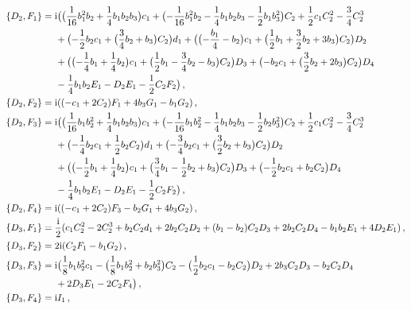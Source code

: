 \documentclass[10pt]{amsart}
\theoremstyle{definition}
\theoremstyle{corollary}
\theoremstyle{remark}
\theoremstyle{conclusion}
\begin{document}
\begin{align}
\{D_2, F_1\}&={\rm i}\bigl(\bigl(\frac{1}{16}b_1^2 b_2+\frac{1}{4}b_1 b_2 b_3\bigl)c_1+\bigl(-\frac{1}{16}b_1^2 b_2-\frac{1}{4}b_1 b_2 b_3-\frac{1}{2}b_1 b_3^2\bigl)C_2+\frac{1}{2}c_1 C_2^2-\frac{3}{4}C_2^3  \nonumber \\
&\hskip 0.5cm+\bigl(-\frac{1}{2}b_2 c_1+\bigl(\frac{3}{4}b_2+b_3\bigl)C_2\bigl)d_1+\bigl(\bigl(-\frac{b_1}{4}-b_2\bigl)c_1+\bigl(\frac{1}{2}b_1+\frac{3}{2}b_2+3 b_3\bigl)C_2\bigl)D_2 \nonumber \\
&\hskip 0.5cm+\bigl(\bigl(-\frac{1}{4}b_1+\frac{1}{4}b_2\bigl)c_1+\bigl(\frac{1}{2}b_1-\frac{3}{4}b_2-b_3\bigl)C_2\bigl)D_3+\bigl(-b_2 c_1+\bigl(\frac{3}{2}b_2+2 b_3\bigl)C_2\bigl)D_4 \nonumber \\
&\hskip 0.5cm-\frac{1}{4}b_1 b_2 E_1-D_2 E_1-\frac{1}{2}C_2 F_2\bigl) \, , \nonumber \\
\{D_2, F_2\}&={\rm i}((-c_1+2 C_2)F_1+4 b_3 G_1-b_1 G_2) \, , \nonumber \\
\{D_2, F_3\}&={\rm i}\bigl(\bigl(\frac{1}{16}b_1 b_2^2+\frac{1}{4}b_1 b_2 b_3\bigl)c_1+\bigl(-\frac{1}{16}b_1 b_2^2-\frac{1}{4}b_1 b_2 b_3-\frac{1}{2}b_2 b_3^2\bigl)C_2+\frac{1}{2}c_1 C_2^2-\frac{3}{4}C_2^3 \nonumber \\
&\hskip 0.5cm+\bigl(-\frac{1}{4}b_2 c_1+\frac{1}{2}b_2C_2\bigl)d_1+\bigl(-\frac{3}{4}b_2c_1+\bigl(\frac{3}{2}b_2+b_3\bigl)C_2\bigl)D_2\nonumber \\
&\hskip 0.5cm+\bigl(\bigl(-\frac{1}{2}b_1+\frac{1}{4}b_2\bigl)c_1+\bigl(\frac{3}{4}b_1-\frac{1}{2}b_2+b_3\bigl)C_2\bigl)D_3+\bigl(-\frac{1}{2}b_2 c_1+b_2 C_2\bigl)D_4 \nonumber \\
&\hskip 0.5cm-\frac{1}{4}b_1 b_2 E_1-D_2 E_1-\frac{1}{2}C_2 F_2\bigl) \, ,\nonumber \\
\{D_2, F_4\}&={\rm i}((-c_1+2 C_2)F_3- b_2 G_1+4 b_3 G_2)\, ,\nonumber \\
\{D_3, F_1\}&=\frac{{\rm i}}{2}(c_1 C_2^2-2 C_2^3+b_2 C_2 d_1+2 b_2 C_2 D_2+(b_1-b_2)C_2 D_3+2 b_2 C_2 D_4-b_1 b_2 E_1 +4 D_2 E_1)\, ,\nonumber \\
\{D_3, F_2\}&=2 {\rm i}(C_2 F_1-b_1 G_2)\, ,\nonumber \\
\{D_3, F_3\}&= {\rm i} \bigl(\frac{1}{8}b_1 b_2^2 c_1-\bigl(\frac{1}{8}b_1 b_2^2+b_2 b_3^2\bigl)C_2-\bigl(\frac{1}{2}b_2 c_1-b_2 C_2\bigl)D_2+2 b_3 C_2 D_3-b_2 C_2 D_4\nonumber \\
&\hskip 0.5cm+2 D_3 E_1-2 C_2 F_4\bigl)\, ,\nonumber \\
\{D_3, F_4\}&={\rm i} I_1 \, ,\nonumber \\

\end{align}
\end{document}
